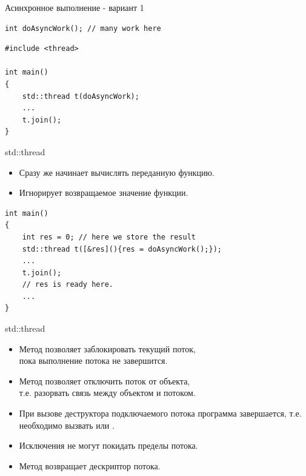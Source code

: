 \documentclass{beamer}
\begin{document}
\begin{frame}[fragile]{Асинхронное выполнение - вариант 1}

\begin{lstlisting}
int doAsyncWork(); // many work here
\end{lstlisting}

\begin{lstlisting}
#include <thread>

int main()
{
    std::thread t(doAsyncWork);
    ...
    t.join();
}
\end{lstlisting}
\end{frame}

\begin{frame}[fragile]{std::thread}
    \begin{itemize}
        \item Сразу же начинает вычислять переданную функцию.

        \item Игнорирует возвращаемое значение функции.
    \end{itemize}
\begin{lstlisting}
int main()
{
    int res = 0; // here we store the result
    std::thread t([&res](){res = doAsyncWork();});
    ...
    t.join();
    // res is ready here.
    ...
}
\end{lstlisting}
\end{frame}

\begin{frame}[fragile]{std::thread}       
    \begin{itemize}
        \item Метод  позволяет заблокировать текущий поток,\\ пока
            выполнение потока не завершится.
        \item Метод  позволяет отключить поток от объекта,\\
            т.е. разорвать связь между объектом и потоком.
        \item При вызове деструктора подключаемого потока программа
            завершается, т.е. необходимо вызвать  или .
        \item Исключения не могут покидать пределы потока.
        \item Метод  возвращает дескриптор потока.
    \end{itemize}
\end{frame}
\end{document}
